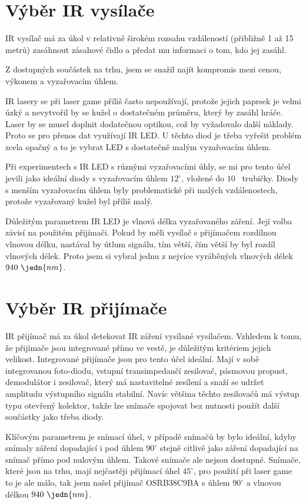 \section{Výběr IR vysílače}
IR vysílač má za úkol v relativně širokém rozsahu vzdáleností (přibližně 1 až 15 metrů) zasáhnout zásahové čidlo a předat mu informaci o tom, kdo jej zasáhl.

Z dostupných součástek na trhu, jsem se snažil najít kompromis mezi cenou, výkonem a vyzařovacím úhlem.

IR lasery se při laser game příliš často nepoužívají, protože jejich paprsek je velmi úzký a nevytvořil by se kužel o dostatečném průměru, který by zasáhl hráče. Laser by se musel doplnit dodatečnou optikou, což by vyžadovalo další náklady. Proto se pro přenos dat využívají IR LED. U těchto diod je třeba vyřešit problém zcela opačný a to je vybrat LED s dostatečně malým vyzařovacím úhlem.

Při experimentech s IR LED s různými vyzařovacími úhly, se mi pro tento účel jevili jako ideální diody s vyzařovacím úhlem $12^\circ$, vložené do $10$~ trubičky. Diody s menším vyzařovacím úhlem byly problematické při malých vzdálenostech, protože vyzařovaný kužel byl příliš malý.

Důležitým parametrem IR LED je vlnová délka vyzařovaného záření. Její volba závisí na použitém přijímači. Pokud by měli vysílač s přijímačem rozdílnou vlnovou délku, nastával by útlum signálu, tím větší, čím větší by byl rozdíl vlnových délek. Proto jsem si vybral jednu z nejvíce vyráběných vlnových délek $940~\jedn{nm}$.

\section{Výběr IR přijímače}
IR přijímač má za úkol detekovat IR záření vysílané vysílačem. Vzhledem k tomu, že přijímače jsou integrované přímo ve vestě, je důležitým kritériem jejich velikost. Integrované přijímače jsou pro tento účel ideální. Mají v sobě integrovanou foto-diodu, vstupní transimpedančí zesilovač, pásmovou propust, demodulátor i zesilovač, který má nastavitelné zesílení a snaží se udržet amplitudu výstupního signálu stabilní. Navíc většina těchto zesilovačů má výstup typu otevřený kolektor, takže lze snímače spojovat bez nutnosti použít další součástky jako třeba diody.

Klíčovým parametrem je snímací úhel, v případě snímačů by bylo ideální, kdyby snímaly záření dopadající i pod úhlem $90^\circ$ stejně citlivě jako záření dopadající na snímač přímo pod nulovým úhlem. Takové snímače ale nejsou dostupné. Snímače, které jsou na trhu, mají nejčastěji přijímací úhel $45^\circ$, pro použití při laser game to je ale málo, tak jsem našel přijímač OSRB38C9BA s úhlem $90^\circ$ a vlnovou délkou $940~\jedn{nm}$.

